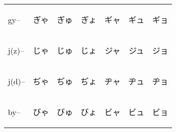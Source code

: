 \begin{table}[H]
\begin{tabular}{l|ccc|ccc}
        gy--   & {\begin{CJK}{UTF8}{min} ぎゃ \end{CJK}} & {\begin{CJK}{UTF8}{min} ぎゅ \end{CJK}} & {\begin{CJK}{UTF8}{min} ぎょ \end{CJK}} & {\begin{CJK}{UTF8}{min} ギャ \end{CJK}} & {\begin{CJK}{UTF8}{min} ギュ \end{CJK}} & {\begin{CJK}{UTF8}{min} ギョ \end{CJK}} \\
        j(z)-- & {\begin{CJK}{UTF8}{min} じゃ \end{CJK}} & {\begin{CJK}{UTF8}{min} じゅ \end{CJK}} & {\begin{CJK}{UTF8}{min} じょ \end{CJK}} & {\begin{CJK}{UTF8}{min} ジャ \end{CJK}} & {\begin{CJK}{UTF8}{min} ジュ \end{CJK}} & {\begin{CJK}{UTF8}{min} ジョ \end{CJK}} \\
        j(d)-- & {\begin{CJK}{UTF8}{min} ぢゃ \end{CJK}} & {\begin{CJK}{UTF8}{min} ぢゅ \end{CJK}} & {\begin{CJK}{UTF8}{min} ぢょ \end{CJK}} & {\begin{CJK}{UTF8}{min} ヂャ \end{CJK}} & {\begin{CJK}{UTF8}{min} ヂュ \end{CJK}} & {\begin{CJK}{UTF8}{min} ヂョ \end{CJK}} \\
        by--   & {\begin{CJK}{UTF8}{min} びゃ \end{CJK}} & {\begin{CJK}{UTF8}{min} びゅ \end{CJK}} & {\begin{CJK}{UTF8}{min} びょ \end{CJK}} & {\begin{CJK}{UTF8}{min} ビャ \end{CJK}} & {\begin{CJK}{UTF8}{min} ビュ \end{CJK}} & {\begin{CJK}{UTF8}{min} ビョ \end{CJK}} \\

\end{tabular}
\end{table}
